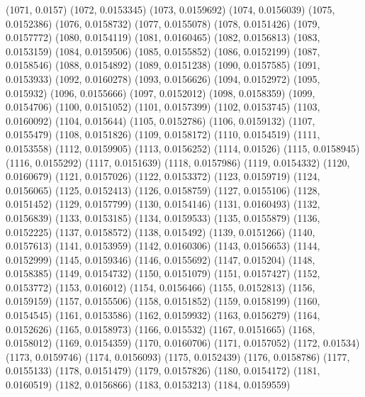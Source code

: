 {					(1071, 0.0157)
					(1072, 0.0153345)
					(1073, 0.0159692)
					(1074, 0.0156039)
					(1075, 0.0152386)
					(1076, 0.0158732)
					(1077, 0.0155078)
					(1078, 0.0151426)
					(1079, 0.0157772)
					(1080, 0.0154119)
					(1081, 0.0160465)
					(1082, 0.0156813)
					(1083, 0.0153159)
					(1084, 0.0159506)
					(1085, 0.0155852)
					(1086, 0.0152199)
					(1087, 0.0158546)
					(1088, 0.0154892)
					(1089, 0.0151238)
					(1090, 0.0157585)
					(1091, 0.0153933)
					(1092, 0.0160278)
					(1093, 0.0156626)
					(1094, 0.0152972)
					(1095, 0.015932)
					(1096, 0.0155666)
					(1097, 0.0152012)
					(1098, 0.0158359)
					(1099, 0.0154706)
					(1100, 0.0151052)
					(1101, 0.0157399)
					(1102, 0.0153745)
					(1103, 0.0160092)
					(1104, 0.015644)
					(1105, 0.0152786)
					(1106, 0.0159132)
					(1107, 0.0155479)
					(1108, 0.0151826)
					(1109, 0.0158172)
					(1110, 0.0154519)
					(1111, 0.0153558)
					(1112, 0.0159905)
					(1113, 0.0156252)
					(1114, 0.01526)
					(1115, 0.0158945)
					(1116, 0.0155292)
					(1117, 0.0151639)
					(1118, 0.0157986)
					(1119, 0.0154332)
					(1120, 0.0160679)
					(1121, 0.0157026)
					(1122, 0.0153372)
					(1123, 0.0159719)
					(1124, 0.0156065)
					(1125, 0.0152413)
					(1126, 0.0158759)
					(1127, 0.0155106)
					(1128, 0.0151452)
					(1129, 0.0157799)
					(1130, 0.0154146)
					(1131, 0.0160493)
					(1132, 0.0156839)
					(1133, 0.0153185)
					(1134, 0.0159533)
					(1135, 0.0155879)
					(1136, 0.0152225)
					(1137, 0.0158572)
					(1138, 0.015492)
					(1139, 0.0151266)
					(1140, 0.0157613)
					(1141, 0.0153959)
					(1142, 0.0160306)
					(1143, 0.0156653)
					(1144, 0.0152999)
					(1145, 0.0159346)
					(1146, 0.0155692)
					(1147, 0.015204)
					(1148, 0.0158385)
					(1149, 0.0154732)
					(1150, 0.0151079)
					(1151, 0.0157427)
					(1152, 0.0153772)
					(1153, 0.016012)
					(1154, 0.0156466)
					(1155, 0.0152813)
					(1156, 0.0159159)
					(1157, 0.0155506)
					(1158, 0.0151852)
					(1159, 0.0158199)
					(1160, 0.0154545)
					(1161, 0.0153586)
					(1162, 0.0159932)
					(1163, 0.0156279)
					(1164, 0.0152626)
					(1165, 0.0158973)
					(1166, 0.015532)
					(1167, 0.0151665)
					(1168, 0.0158012)
					(1169, 0.0154359)
					(1170, 0.0160706)
					(1171, 0.0157052)
					(1172, 0.01534)
					(1173, 0.0159746)
					(1174, 0.0156093)
					(1175, 0.0152439)
					(1176, 0.0158786)
					(1177, 0.0155133)
					(1178, 0.0151479)
					(1179, 0.0157826)
					(1180, 0.0154172)
					(1181, 0.0160519)
					(1182, 0.0156866)
					(1183, 0.0153213)
					(1184, 0.0159559)
}
